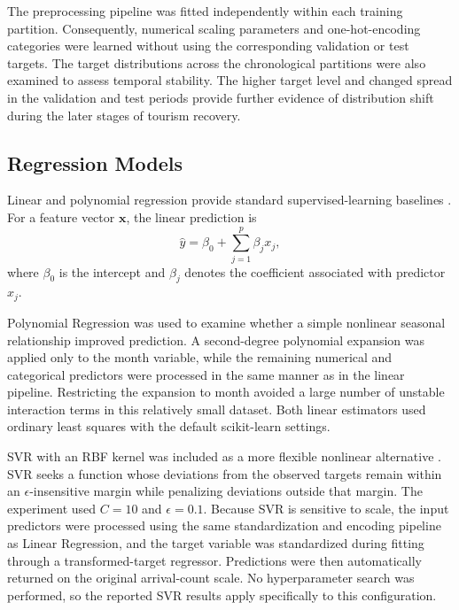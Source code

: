 \documentclass[conference,a4paper]{IEEEtran}
\begin{document}
The preprocessing pipeline was fitted independently within each training partition. Consequently, numerical scaling parameters and one-hot-encoding categories were learned without using the corresponding validation or test targets. The target distributions across the chronological partitions were also examined to assess temporal stability. The higher target level and changed spread in the validation and test periods provide further evidence of distribution shift during the later stages of tourism recovery.

\subsection{Regression Models}
Linear and polynomial regression provide standard supervised-learning baselines \cite{hastie2009elements}. For a feature vector $\mathbf{x}$, the linear prediction is
\begin{equation}
    \hat{y}=\beta_0+\sum_{j=1}^{p}\beta_j x_j,
\end{equation}
where $\beta_0$ is the intercept and $\beta_j$ denotes the coefficient associated with predictor $x_j$.

Polynomial Regression was used to examine whether a simple nonlinear seasonal relationship improved prediction. A second-degree polynomial expansion was applied only to the month variable, while the remaining numerical and categorical predictors were processed in the same manner as in the linear pipeline. Restricting the expansion to month avoided a large number of unstable interaction terms in this relatively small dataset. Both linear estimators used ordinary least squares with the default scikit-learn settings.

SVR with an RBF kernel was included as a more flexible nonlinear alternative \cite{smola2004svr}. SVR seeks a function whose deviations from the observed targets remain within an $\epsilon$-insensitive margin while penalizing deviations outside that margin. The experiment used $C=10$ and $\epsilon=0.1$. Because SVR is sensitive to scale, the input predictors were processed using the same standardization and encoding pipeline as Linear Regression, and the target variable was standardized during fitting through a transformed-target regressor. Predictions were then automatically returned on the original arrival-count scale. No hyperparameter search was performed, so the reported SVR results apply specifically to this configuration.
\end{document}
